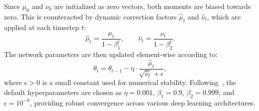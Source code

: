 Since $\mu_0$ and $\nu_0$ are initialized as zero vectors, both moments are biased towards zero. 
This is counteracted by dynamic correction factors $\hat{\mu}_t$ and $\hat{\nu}_t$, 
which are applied at each timestep $t$:
\begin{equation}
    \label{eq:adam-bias-correction}
    \hat{\mu}_t = \frac{\mu_t}{1 - \beta_1^t}, \qquad \hat{\nu}_t = \frac{\nu_t}{1 - \beta_2^t}.
\end{equation}
The network parameters are then updated element-wise according to:
\begin{equation}
    \label{eq:adam-update}
    \theta_t = \theta_{t-1} - \eta \cdot \frac{\hat{\mu}_t}{\sqrt{\hat{\nu}_t} + \epsilon},
\end{equation}
where $\epsilon > 0$ is a small constant used for numerical stability. Following~\cite{kingmaAdamMethodStochastic2015}, 
the default hyperparameters are chosen as $\eta = 0.001$, $\beta_1 = 0.9$, $\beta_2 = 0.999$, and $\epsilon = 10^{-8}$, 
providing robust convergence across various deep learning architectures. 